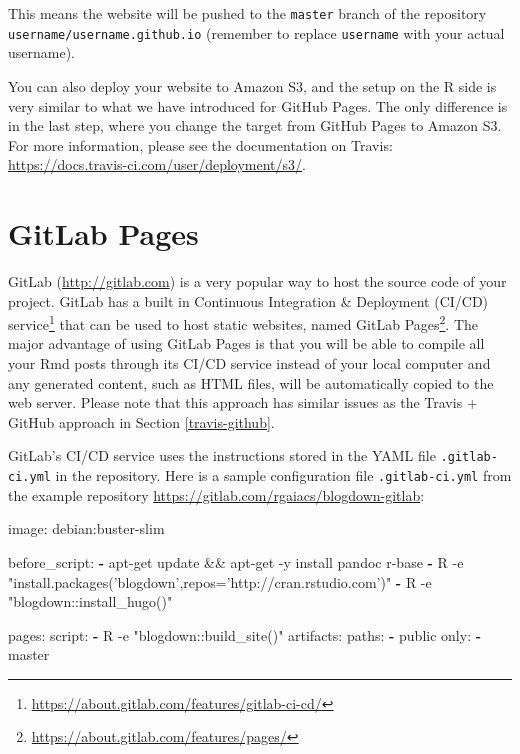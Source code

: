 \documentclass[12pt,]{krantz}
\makeatletter
\newenvironment{Shaded}{\begin{snugshade}}{\end{snugshade}}
\newcommand{\KeywordTok}[1]{\textcolor[rgb]{0.13,0.29,0.53}{\textbf{#1}}}
\newcommand{\FunctionTok}[1]{\textcolor[rgb]{0.00,0.00,0.00}{#1}}
\newcommand{\AttributeTok}[1]{\textcolor[rgb]{0.77,0.63,0.00}{#1}}
\newcommand{\NormalTok}[1]{#1}
\renewcommand{\href}[2]{#2\footnote{\url{#1}}}
\newenvironment{kframe}{%
\medskip{}
\setlength{\fboxsep}{.8em}
 \def\at@end@of@kframe{}%
 \ifinner\ifhmode%
  \def\at@end@of@kframe{\end{minipage}}%
  \begin{minipage}{\columnwidth}%
 \fi\fi%
 \def\FrameCommand##1{\hskip\@totalleftmargin \hskip-\fboxsep
 \colorbox{shadecolor}{##1}\hskip-\fboxsep
     \hskip-\linewidth \hskip-\@totalleftmargin \hskip\columnwidth}%
 \MakeFramed {\advance\hsize-\width
   \@totalleftmargin\z@ \linewidth\hsize
   \@setminipage}}%
 {\par\unskip\endMakeFramed%
 \at@end@of@kframe}
\renewenvironment{Shaded}{\begin{kframe}}{\end{kframe}}
\theoremstyle{definition}
\theoremstyle{definition}
\theoremstyle{definition}
\theoremstyle{remark}
\makeatother
\begin{document}
This means the website will be pushed to the \texttt{master} branch of
the repository \texttt{username/username.github.io} (remember to replace
\texttt{username} with your actual username).

You can also deploy your website to Amazon S3, and the
setup on the R side is very similar to what we have introduced for
GitHub Pages. The only difference is in the last step, where you change
the target from GitHub Pages to Amazon S3. For more information, please
see the documentation on Travis:
\url{https://docs.travis-ci.com/user/deployment/s3/}.

\section{GitLab Pages}\label{gitlab-pages}

GitLab (\url{http://gitlab.com}) is a very popular way to host the
source code of your project. GitLab has a
\href{https://about.gitlab.com/features/gitlab-ci-cd/}{built in
Continuous Integration \& Deployment (CI/CD) service} that can be used
to host static websites, named
\href{https://about.gitlab.com/features/pages/}{GitLab Pages}. The major
advantage of using GitLab Pages is that you will be able to compile all
your Rmd posts through its CI/CD service instead of your local computer
and any generated content, such as HTML files, will be automatically
copied to the web server. Please note that this approach has similar
issues as the Travis + GitHub approach in Section \ref{travis-github}.

GitLab's CI/CD service uses the instructions stored in the YAML file
\texttt{.gitlab-ci.yml} in the repository. Here is a sample
configuration file \texttt{.gitlab-ci.yml} from the example repository
\url{https://gitlab.com/rgaiacs/blogdown-gitlab}:

\begin{Shaded}
\begin{Highlighting}[]
\FunctionTok{image:}\AttributeTok{ debian:buster-slim}

\FunctionTok{before_script:}
  \KeywordTok{-}\NormalTok{ apt-get update && apt-get -y install pandoc r-base}
  \KeywordTok{-} \FunctionTok{R -e "install.packages('blogdown',repos='http:}\AttributeTok{//cran.rstudio.com')"}
  \KeywordTok{-} \FunctionTok{R -e "blogdown:}\AttributeTok{:install_hugo()"}

\FunctionTok{pages:}
  \FunctionTok{script:}
    \KeywordTok{-} \FunctionTok{R -e "blogdown:}\AttributeTok{:build_site()"}
  \FunctionTok{artifacts:}
    \FunctionTok{paths:}
      \KeywordTok{-}\NormalTok{ public}
  \FunctionTok{only:}
    \KeywordTok{-}\NormalTok{ master}
\end{Highlighting}
\end{Shaded}
\end{document}
